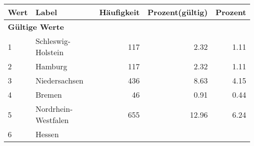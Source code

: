      \begin{longtable}{lXrrr}
     \toprule
     \textbf{Wert} & \textbf{Label} & \textbf{Häufigkeit} & \textbf{Prozent(gültig)} & \textbf{Prozent} \\
     \endhead
     \midrule
     \multicolumn{5}{l}{\textbf{Gültige Werte}}\\

     1 &
     \multicolumn{1}{X}{ Schleswig-Holstein   } &


       \num{117} &
       \num[round-mode=places,round-precision=2]{2.32} &
         \num[round-mode=places,round-precision=2]{1.11} \\

     2 &
     \multicolumn{1}{X}{ Hamburg   } &


       \num{117} &
       \num[round-mode=places,round-precision=2]{2.32} &
         \num[round-mode=places,round-precision=2]{1.11} \\

     3 &
     \multicolumn{1}{X}{ Niedersachsen   } &


       \num{436} &
       \num[round-mode=places,round-precision=2]{8.63} &
         \num[round-mode=places,round-precision=2]{4.15} \\

     4 &
     \multicolumn{1}{X}{ Bremen   } &


       \num{46} &
       \num[round-mode=places,round-precision=2]{0.91} &
         \num[round-mode=places,round-precision=2]{0.44} \\

     5 &
     \multicolumn{1}{X}{ Nordrhein-Westfalen   } &


       \num{655} &
       \num[round-mode=places,round-precision=2]{12.96} &
         \num[round-mode=places,round-precision=2]{6.24} \\

     6 &
     \multicolumn{1}{X}{ Hessen   } &



\end{longtable}
